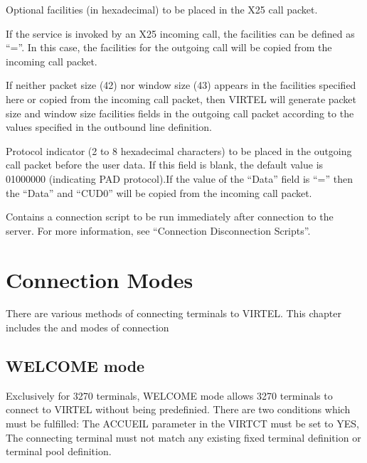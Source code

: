 \documentclass[letterpaper,10pt,english]{sphinxmanual}
\begin{document}
\begin{description}
\sphinxAtStartPar
Optional facilities (in hexadecimal) to be placed in the X25 call packet.

\sphinxAtStartPar
If the service is invoked by an X25 incoming call, the facilities can be defined as “=”. In this case, the facilities for the outgoing call will be copied from the incoming call packet.

\sphinxAtStartPar
If neither packet size (42) nor window size (43) appears in the facilities specified here or copied from the incoming call packet, then VIRTEL will generate packet size and window size facilities fields in the outgoing call packet according to the values specified in the outbound line definition.

\sphinxAtStartPar
Protocol indicator (2 to 8 hexadecimal characters) to be placed in the outgoing call packet before the user data. If this field is blank, the default value is 01000000 (indicating PAD protocol).If the value of the “Data” field is “=” then the “Data” and “CUD0” will be copied from the incoming call packet.

\sphinxAtStartPar
Contains a connection script to be run immediately after connection to the server. For more information, see “Connection \textendash{} Disconnection Scripts”.

\end{description}

\ignorespaces 

\chapter{Connection Modes}
\label{\detokenize{connectivity_guide:connection-modes}}\label{\detokenize{connectivity_guide:index-135}}
\sphinxAtStartPar
There are various methods of connecting terminals to VIRTEL. This chapter includes the  and  modes of connection

\ignorespaces 

\section{WELCOME mode}
\label{\detokenize{connectivity_guide:welcome-mode}}\label{\detokenize{connectivity_guide:index-136}}
\sphinxAtStartPar
Exclusively for 3270 terminals, WELCOME mode allows 3270 terminals to connect to VIRTEL without being predefinied.
There are two conditions which must be fulfilled:
\sphinxhyphen{} The ACCUEIL parameter in the VIRTCT must be set to YES,
\sphinxhyphen{} The connecting terminal must not match any existing fixed terminal definition or terminal pool definition.
\end{document}
